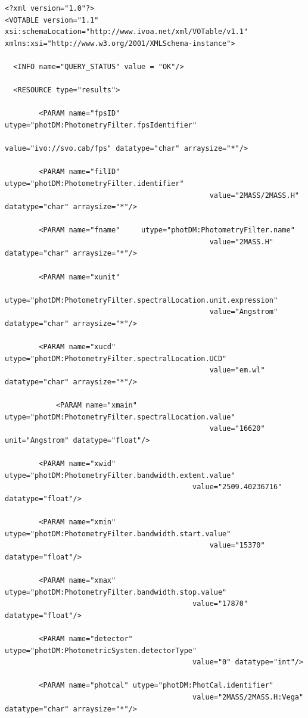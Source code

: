 \documentclass[11pt,a4paper]{ivoa}
\begin{document}
\begin{verbatim}
<?xml version="1.0"?>
<VOTABLE version="1.1" xsi:schemaLocation="http://www.ivoa.net/xml/VOTable/v1.1"
xmlns:xsi="http://www.w3.org/2001/XMLSchema-instance">
                                                                  
  <INFO name="QUERY_STATUS" value = "OK"/>
 
  <RESOURCE type="results">
    
        <PARAM name="fpsID" 	utype="photDM:PhotometryFilter.fpsIdentifier" 
        										value="ivo://svo.cab/fps" datatype="char" arraysize="*"/>
        										
        <PARAM name="filID" 	utype="photDM:PhotometryFilter.identifier" 
        										value="2MASS/2MASS.H" datatype="char" arraysize="*"/>
        										
        <PARAM name="fname" 	utype="photDM:PhotometryFilter.name" 
        										value="2MASS.H" datatype="char" arraysize="*"/>
        										
        <PARAM name="xunit" 
        	utype="photDM:PhotometryFilter.spectralLocation.unit.expression" 
        										value="Angstrom" datatype="char" arraysize="*"/>
        										
        <PARAM name="xucd"  	utype="photDM:PhotometryFilter.spectralLocation.UCD"	
        										value="em.wl" datatype="char" arraysize="*"/>
        										
    		<PARAM name="xmain" 	utype="photDM:PhotometryFilter.spectralLocation.value"
    											value="16620" unit="Angstrom" datatype="float"/>
    											
		<PARAM name="xwid"	utype="photDM:PhotometryFilter.bandwidth.extent.value" 
											value="2509.40236716" datatype="float"/>
											
        <PARAM name="xmin"  utype="photDM:PhotometryFilter.bandwidth.start.value" 
        										value="15370" datatype="float"/>
        										
   		<PARAM name="xmax"  utype="photDM:PhotometryFilter.bandwidth.stop.value" 
   											value="17870" datatype="float"/>
   											
		<PARAM name="detector" utype="photDM:PhotometricSystem.detectorType"
											value="0" datatype="int"/>
											
		<PARAM name="photcal" utype="photDM:PhotCal.identifier"
											value="2MASS/2MASS.H:Vega" datatype="char" arraysize="*"/>
    

\end{verbatim}
\end{document}
